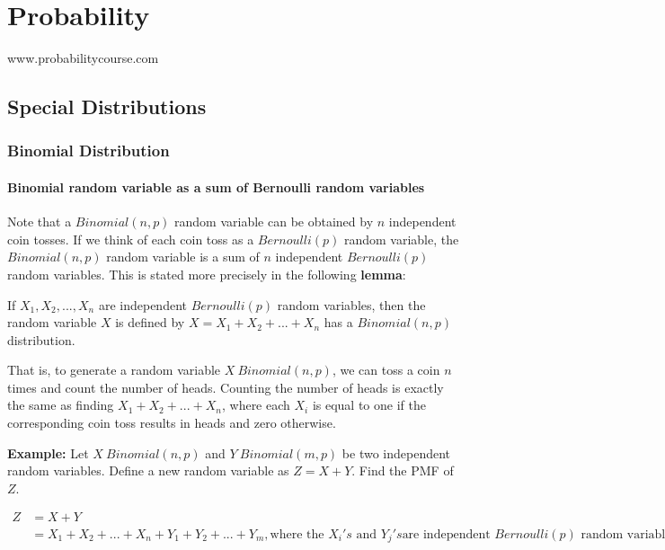\documentclass{report}
\begin{document}
\tableofcontents{}

\chapter{Probability}
www.probabilitycourse.com


\section{Special Distributions}
\subsection{Binomial Distribution}

\subsubsection{Binomial random variable as a sum of Bernoulli random variables}
\noindent Note that a $Binomial(n,p)$ random variable can be obtained by $n$ independent coin tosses. If we think of each coin toss as a $Bernoulli(p)$ random variable, the $Binomial(n,p)$ random variable is a sum of $n$ independent $Bernoulli(p)$ random variables. This is stated more precisely in the following \textbf{lemma}:\newline

\noindent If $X_1,X_2,...,X_n$ are independent $Bernoulli(p)$ random variables, then the random variable $X$ is defined by $X=X_1+X_2+...+X_n$ has a $Binomial(n,p)$ distribution.\newline

\noindent That is, to generate a random variable $X ~ Binomial(n,p)$, we can toss a coin $n$ times and count the number of heads. Counting the number of heads is exactly the same as finding $X_1+X_2+...+X_n$, where each $X_i$ is equal to one if the corresponding coin toss results in heads and zero otherwise.\newline

\noindent \textbf{Example:} Let $X~Binomial(n,p)$ and $Y~Binomial(m,p)$ be two independent random variables. Define a new random variable as $Z=X+Y$. Find the PMF of $Z$.\newline

$\begin{aligned}
	Z &= X + Y \\
      &= X_1 + X_2 + ... + X_n + Y_1 + Y_2 + ... + Y_m, 
      \text{where the } X_i's \text{ and } Y_j's \text{are independent } Bernoulli(p) \text{ random variables} \\
\end{aligned}$\newline
\end{document}
